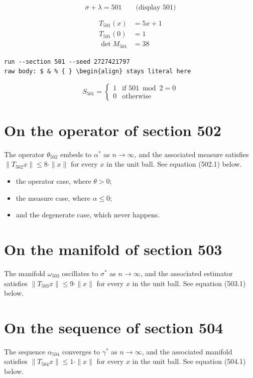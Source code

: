 \documentclass{article}
\begin{document}
$$
\sigma + \lambda = 501 \qquad \text{(display 501)}
$$

\begin{align}
T_{501}(x) &= 5 x + 1 \\
T_{501}(0) &= 1 \\
\det M_{501} &= 38
\end{align}

\begin{verbatim}
run --section 501 --seed 2727421797
raw body: $ & % { } \begin{align} stays literal here
\end{verbatim}

\begin{equation}
S_{501} = \begin{cases} 1 & \text{if } 501 \bmod 2 = 0 \\ 0 & \text{otherwise} \end{cases}
\end{equation}

\section{On the operator of section 502}
The operator $\theta_{502}$ embeds to $\alpha^{*}$ as $n \to \infty$,
and the associated measure satisfies $\|T_{502} x\| \leq 8 \cdot \|x\|$
for every $x$ in the unit ball. See equation (502.1) below.

\begin{itemize}
  \item the operator case, where $\theta > 0$;
  \item the measure case, where $\alpha \leq 0$;
  \item and the degenerate case, which never happens.
\end{itemize}

\section{On the manifold of section 503}
The manifold $\omega_{503}$ oscillates to $\sigma^{*}$ as $n \to \infty$,
and the associated estimator satisfies $\|T_{503} x\| \leq 9 \cdot \|x\|$
for every $x$ in the unit ball. See equation (503.1) below.

\section{On the sequence of section 504}
The sequence $\alpha_{504}$ converges to $\gamma^{*}$ as $n \to \infty$,
and the associated manifold satisfies $\|T_{504} x\| \leq 1 \cdot \|x\|$
for every $x$ in the unit ball. See equation (504.1) below.
\end{document}
